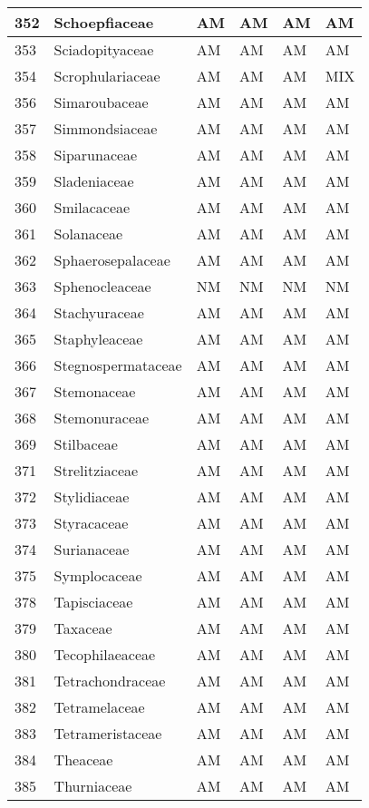 \documentclass[]{article}
\begin{document}
\begin{longtable}{l|l|l|l|l|l}
\hline
352 & Schoepfiaceae & AM & AM & AM & AM\\
\hline
353 & Sciadopityaceae & AM & AM & AM & AM\\
\hline
354 & Scrophulariaceae & AM & AM & AM & MIX\\
\hline
356 & Simaroubaceae & AM & AM & AM & AM\\
\hline
357 & Simmondsiaceae & AM & AM & AM & AM\\
\hline
358 & Siparunaceae & AM & AM & AM & AM\\
\hline
359 & Sladeniaceae & AM & AM & AM & AM\\
\hline
360 & Smilacaceae & AM & AM & AM & AM\\
\hline
361 & Solanaceae & AM & AM & AM & AM\\
\hline
362 & Sphaerosepalaceae & AM & AM & AM & AM\\
\hline
363 & Sphenocleaceae & NM & NM & NM & NM\\
\hline
364 & Stachyuraceae & AM & AM & AM & AM\\
\hline
365 & Staphyleaceae & AM & AM & AM & AM\\
\hline
366 & Stegnospermataceae & AM & AM & AM & AM\\
\hline
367 & Stemonaceae & AM & AM & AM & AM\\
\hline
368 & Stemonuraceae & AM & AM & AM & AM\\
\hline
369 & Stilbaceae & AM & AM & AM & AM\\
\hline
371 & Strelitziaceae & AM & AM & AM & AM\\
\hline
372 & Stylidiaceae & AM & AM & AM & AM\\
\hline
373 & Styracaceae & AM & AM & AM & AM\\
\hline
374 & Surianaceae & AM & AM & AM & AM\\
\hline
375 & Symplocaceae & AM & AM & AM & AM\\
\hline
378 & Tapisciaceae & AM & AM & AM & AM\\
\hline
379 & Taxaceae & AM & AM & AM & AM\\
\hline
380 & Tecophilaeaceae & AM & AM & AM & AM\\
\hline
381 & Tetrachondraceae & AM & AM & AM & AM\\
\hline
382 & Tetramelaceae & AM & AM & AM & AM\\
\hline
383 & Tetrameristaceae & AM & AM & AM & AM\\
\hline
384 & Theaceae & AM & AM & AM & AM\\
\hline
385 & Thurniaceae & AM & AM & AM & AM\\

\end{longtable}
\end{document}
